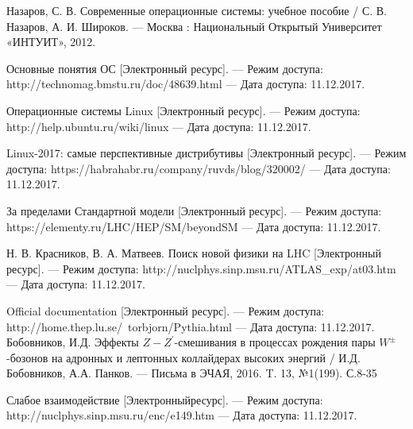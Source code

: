 

	Назаров, С. В. 
	Современные операционные системы: учебное пособие 
	/ С. В. Назаров, А. И. Широков. 
	— Москва : Национальный Открытый Университет «ИНТУИТ», 2012.

	Основные понятия ОС 
	[Электронный ресурс].
	 — Режим досту­па: http://technomag.bmstu.ru/doc/48639.html
	 — Дата доступа: 11.12.2017.

	Операционные системы Linux 
	[Электронный ресурс].
	 — Ре­жим доступа: http://help.ubuntu.ru/wiki/linux
	 — Дата доступа: 11.12.2017.
	 
	 Linux-2017: самые перспективные дистрибутивы  
	 [Электронный ресурс].
	 — Ре­жим доступа: https://habrahabr.ru/company/ruvds/blog/320002/
	 — Дата доступа: 11.12.2017.

	За пределами Стандартной модели
	[Электронный ресурс].
	 — Режим доступа: https://elementy.ru/LHC/HEP/SM/beyondSM 
	 — Да­та доступа: 11.12.2017.


	Н. В. Красников, В. А. 
	Матвеев. Поиск новой физики на LHC
	[Электронный ресурс].
	 — Режим доступа: http://nuclphys.sinp.msu.ru/ATLAS\_exp/at03.htm 
	 — Дата доступа: 11.12.2017.
	 
	 Official documentation
	 [Электронный ресурс].
	 — Режим доступа: http://home.thep.lu.se/~torbjorn/Pythia.html 
	 — Дата доступа: 11.12.2017.
	Бобовников, И.Д. Эффекты $Z-Z^\prime$-смешивания в процессах рождения пары $W^±$-бозонов на адронных и лептонных коллайдерах высоких энергий
	/ И.Д. Бобовников, А.А. Панков.
	— Письма в ЭЧАЯ, 2016. T. 13, №1(199). С.8-35
	
	Слабое взаимодействие 
	[Электронныйресурс].
	— Режим доступа: http://nuclphys.sinp.msu.ru/enc/e149.htm
	— Дата доступа: 11.12.2017.

	 
